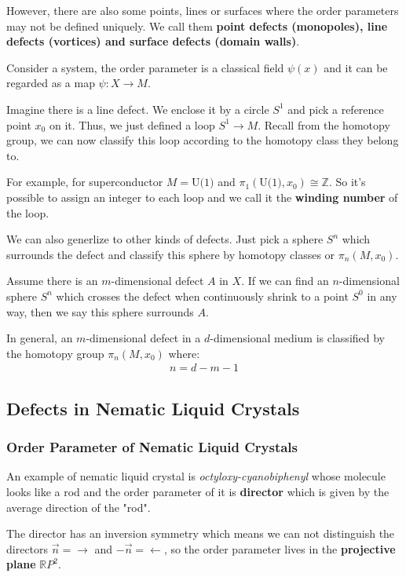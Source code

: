 \documentclass[10pt]{article}
\begin{document}
However, there are also some points, lines or surfaces where the order parameters may not be defined uniquely.
We call them \textbf{point defects (monopoles), line defects (vortices) and surface defects (domain walls)}.

Consider a system, the order parameter is a classical field $\psi(x)$ and it can be regarded as a map $\psi:X\to M$.

Imagine there is a line defect.
We enclose it by a circle $S^1$ and pick a reference point $x_0$ on it.
Thus, we just defined a loop $S^1\to M$.
Recall from the homotopy group, we can now classify this loop according to the homotopy class they belong to.

For example, for superconductor $M=\text{U(1)}$ and $\pi_1\left(\text{U(1)},x_0\right)\cong\mathbb{Z}$.
So it's possible to assign an integer to each loop and we call it the \textbf{winding number} of the loop.

We can also generlize to other kinds of defects.
Just pick a sphere $S^n$ which surrounds the defect and classify this sphere by homotopy classes or $\pi_n(M,x_0)$.
\begin{remark}
    Assume there is an $m$-dimensional defect $A$ in $X$.
    If we can find an $n$-dimensional sphere $S^n$ which crosses the defect when continuously shrink to a point $S^0$ in any way, then we say this sphere surrounds $A$.
\end{remark}

In general, an $m$-dimensional defect in a $d$-dimensional medium is classified by the homotopy group $\pi_n(M,x_0)$ where:
\begin{align}
    n=d-m-1
\end{align}

\subsection{Defects in Nematic Liquid Crystals}
\subsubsection{Order Parameter of Nematic Liquid Crystals}
An example of nematic liquid crystal is \textit{octyloxy-cyanobiphenyl} whose molecule looks like a rod and the order parameter of it is \textbf{director} which is given by the average direction of the "rod".

The director has an inversion symmetry which means we can not distinguish the directors $\vec{n}=\rightarrow$ and $-\vec{n}=\leftarrow$, so the order parameter lives in the \textbf{projective plane} $\mathbb{R}P^2$.
\end{document}
